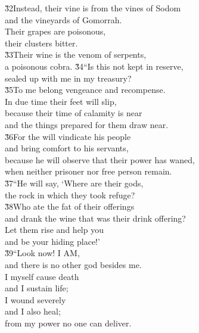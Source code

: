 \begin{poetry}
\poeml \v{32}Instead, their vine is from the vines of Sodom \\
\poemll    and the vineyards of Gomorrah. \\
\poeml Their grapes are poisonous, \\
\poemll    their clusters bitter. \\
\poeml \v{33}Their wine is the venom of serpents, \\
\poemll    a poisonous cobra.
\poeml \v{34}``Is this not kept in reserve, \\
\poemll    sealed up with me in my treasury? \\
\poeml \v{35}To me belong vengeance and recompense. \\
\poemll    In due time their feet will slip, \\
\poeml because their time of calamity is near \\
\poemll    and the things prepared for them draw near. \\
\poeml \v{36}For the  will vindicate his people \\
\poemll    and bring comfort to his servants, \\
\poeml because he will observe that their power has waned, \\
\poemll    when neither prisoner nor free person remain. \\
\poeml \v{37}``He will say, `Where are their gods, \\
\poemll    the rock in which they took refuge? \\
\poeml \v{38}Who ate the fat of their offerings \\
\poemll    and drank the wine that was their drink offering? \\
\poeml Let them rise and help you \\
\poemll    and be your hiding place!' \\
\poeml \v{39}``Look now! I AM, \\
\poemll    and there is no other god besides me. \\
\poeml I myself cause death \\
\poemll    and I sustain life; \\
\poeml I wound severely \\
\poemll    and I also heal; \\
\poemlll       from my power no one can deliver. \\

\end{poetry}
